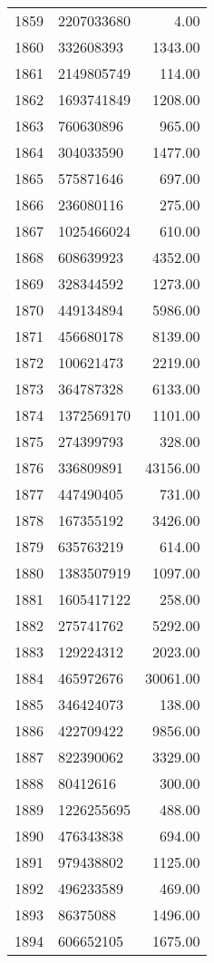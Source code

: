 \begin{table}[ht]
\begin{tabular}{rlr}
  1859 & 2207033680 & 4.00 \\ 
  1860 & 332608393 & 1343.00 \\ 
  1861 & 2149805749 & 114.00 \\ 
  1862 & 1693741849 & 1208.00 \\ 
  1863 & 760630896 & 965.00 \\ 
  1864 & 304033590 & 1477.00 \\ 
  1865 & 575871646 & 697.00 \\ 
  1866 & 236080116 & 275.00 \\ 
  1867 & 1025466024 & 610.00 \\ 
  1868 & 608639923 & 4352.00 \\ 
  1869 & 328344592 & 1273.00 \\ 
  1870 & 449134894 & 5986.00 \\ 
  1871 & 456680178 & 8139.00 \\ 
  1872 & 100621473 & 2219.00 \\ 
  1873 & 364787328 & 6133.00 \\ 
  1874 & 1372569170 & 1101.00 \\ 
  1875 & 274399793 & 328.00 \\ 
  1876 & 336809891 & 43156.00 \\ 
  1877 & 447490405 & 731.00 \\ 
  1878 & 167355192 & 3426.00 \\ 
  1879 & 635763219 & 614.00 \\ 
  1880 & 1383507919 & 1097.00 \\ 
  1881 & 1605417122 & 258.00 \\ 
  1882 & 275741762 & 5292.00 \\ 
  1883 & 129224312 & 2023.00 \\ 
  1884 & 465972676 & 30061.00 \\ 
  1885 & 346424073 & 138.00 \\ 
  1886 & 422709422 & 9856.00 \\ 
  1887 & 822390062 & 3329.00 \\ 
  1888 & 80412616 & 300.00 \\ 
  1889 & 1226255695 & 488.00 \\ 
  1890 & 476343838 & 694.00 \\ 
  1891 & 979438802 & 1125.00 \\ 
  1892 & 496233589 & 469.00 \\ 
  1893 & 86375088 & 1496.00 \\ 
  1894 & 606652105 & 1675.00 \\ 

\end{tabular}
\end{table}
